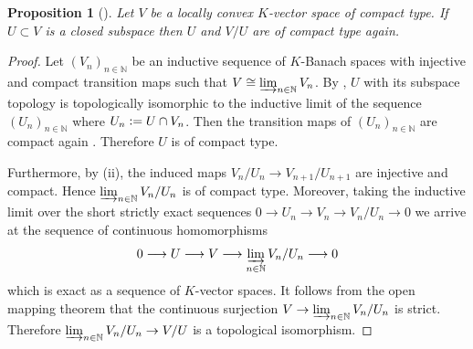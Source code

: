 \documentclass[a4paper, reqno, 10pt]{amsart}
\newtheorem{proposition}[theorem]{Proposition}
\theoremstyle{definition}
\numberwithin{equation}{section}
\newcommand{\defeq}{\vcentcolon=}
\newcommand{\lra}{\longrightarrow}
\newcommand{\ra}{\rightarrow}
\newcommand{\BN}{{\mathbb {N}}}
\begin{document}
\begin{proposition}[{\cite[Prop.\ 1.2 (i)]{SchneiderTeitelbaum02LocAnDistApplToGL2}}]\label{Lemma A1 - Closed subspaces and quotients of spaces of compact type}
Let $V$ be a locally convex $K$-vector space of compact type.
If $U \subset V$ is a closed subspace then $U$ and $V/U$ are of compact type again.
\end{proposition}
\begin{proof}
Let $(V_n)_{n\in \BN}$ be an inductive sequence of $K$-Banach spaces with injective and compact transition maps such that $V \cong \varinjlim_{n \in \BN} V_n$.
By \cite[Thm.\ 3.1.16]{DeGrandeDeKimpeKakolPerezGarciaSchikofS97pAdicLocConvIndLim}, $U$ with its subspace topology is topologically isomorphic to the inductive limit of the sequence $(U_n)_{n\in \BN}$ where $U_n \defeq U\cap V_n$.
Then the transition maps of $(U_n)_{n\in \BN}$ are compact again \cite[Rmk.\ 16.7]{Schneider02NonArchFunctAna}.
Therefore $U$ is of compact type.

Furthermore, by  (ii), the induced maps $V_n/U_n \ra V_{n+1}/U_{n+1}$ are injective and compact.
Hence $\varinjlim_{n \in \BN} V_n/ U_n$ is of compact type.
Moreover, taking the inductive limit over the short strictly exact sequences $0\ra U_n \ra V_n \ra V_n/U_n \ra 0$ we arrive at the sequence of continuous homomorphisms
\begin{equation*}
	0 \lra U \lra V \lra \varinjlim_{n\in \BN} V_n/U_n \lra 0
\end{equation*}
which is exact as a sequence of $K$-vector spaces.
It follows from the open mapping theorem \cite[II.\ \S 4.6 Cor.]{Bourbaki87TopVectSp1to5} that the continuous surjection $V \ra \varinjlim_{n \in \BN} V_n/U_n$ is strict. 
Therefore $\varinjlim_{n \in \BN} V_n/U_n \ra V/U$ is a topological isomorphism.
\end{proof}
\end{document}
